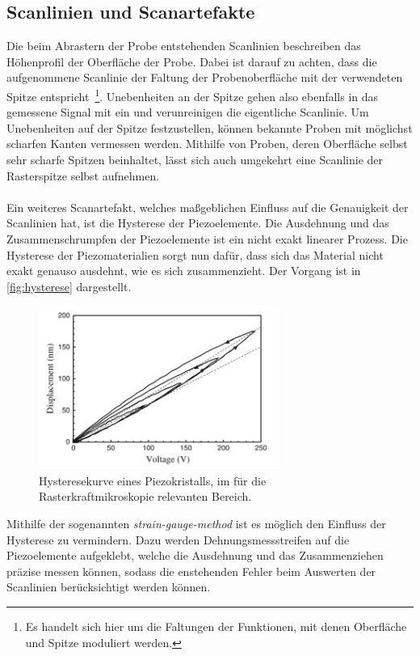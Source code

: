 \subsection{Scanlinien und Scanartefakte}
Die beim Abrastern der Probe entstehenden Scanlinien beschreiben das Höhenprofil der Oberfläche der Probe. Dabei ist darauf zu achten, dass die aufgenommene Scanlinie der Faltung der Probenoberfläche mit der verwendeten Spitze entspricht~\footnote{Es handelt sich hier um die Faltungen der Funktionen, mit denen Oberfläche und Spitze moduliert werden.}. Unebenheiten an der Spitze gehen also ebenfalls in das gemessene Signal mit ein und verunreinigen die eigentliche Scanlinie. Um Unebenheiten auf der Spitze festzustellen, können bekannte Proben mit möglichst scharfen Kanten vermessen werden. Mithilfe von Proben, deren Oberfläche selbst sehr scharfe Spitzen beinhaltet, lässt sich auch umgekehrt eine Scanlinie der Rasterspitze selbst aufnehmen.\\
\\
Ein weiteres Scanartefakt, welches maßgeblichen Einfluss auf die Genauigkeit der Scanlinien hat, ist die Hysterese der Piezoelemente. Die Ausdehnung und das Zusammenschrumpfen der Piezoelemente ist ein nicht exakt linearer Prozess. Die Hysterese der Piezomaterialien sorgt nun dafür, dass sich das Material nicht exakt genauso ausdehnt, wie es sich zusammenzieht. Der Vorgang ist in \autoref{fig:hysterese} dargestellt.
\begin{figure}[H]
  \includegraphics[width=0.7\textwidth]{content/plots/hysterese.jpg}
  \caption{Hysteresekurve eines Piezokristalls, im für die Rasterkraftmikroskopie relevanten Bereich. \cite{Voigt}}
  \label{fig:hysterese}
\end{figure}
Mithilfe der sogenannten \textit{strain-gauge-method} ist es möglich den Einfluss der Hysterese zu vermindern. Dazu werden Dehnungsmessstreifen auf die Piezoelemente aufgeklebt, welche die Ausdehnung und das Zusammenziehen präzise messen können, sodass die enstehenden Fehler beim Auswerten der Scanlinien berücksichtigt werden können.\\
